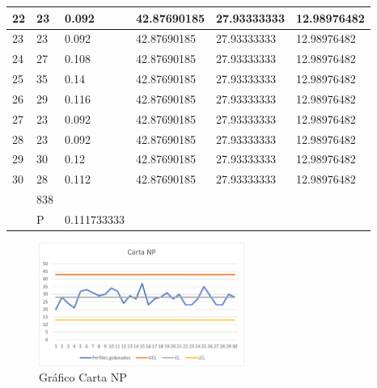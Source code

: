 \documentclass{article}
\theoremstyle{mytheoremstyle}
\theoremstyle{mytheoremstyle}
\theoremstyle{myproblemstyle}
\begin{document}
\begin{table}[H]
\begin{tabular}{|l|l|l|l|l|l|}
        22 & 23 & 0.092 & 42.87690185 & 27.93333333 & 12.98976482 \\ \hline
        23 & 23 & 0.092 & 42.87690185 & 27.93333333 & 12.98976482 \\ \hline
        24 & 27 & 0.108 & 42.87690185 & 27.93333333 & 12.98976482 \\ \hline
        25 & 35 & 0.14 & 42.87690185 & 27.93333333 & 12.98976482 \\ \hline
        26 & 29 & 0.116 & 42.87690185 & 27.93333333 & 12.98976482 \\ \hline
        27 & 23 & 0.092 & 42.87690185 & 27.93333333 & 12.98976482 \\ \hline
        28 & 23 & 0.092 & 42.87690185 & 27.93333333 & 12.98976482 \\ \hline
        29 & 30 & 0.12 & 42.87690185 & 27.93333333 & 12.98976482 \\ \hline
        30 & 28 & 0.112 & 42.87690185 & 27.93333333 & 12.98976482 \\ \hline
        ~ & 838 & ~ & ~ & ~ & ~ \\ \hline
        ~ & P & 0.111733333 & ~ & ~ & ~ \\ \hline
    \end{tabular}
\end{table}
\begin{figure}[H]
	\centering
	\includegraphics[width=0.6\textwidth]{GrafNP.png}
	\caption[short]{Gráfico Carta NP}
	\label{fig:imagen2}
  \end{figure}
\end{document}
